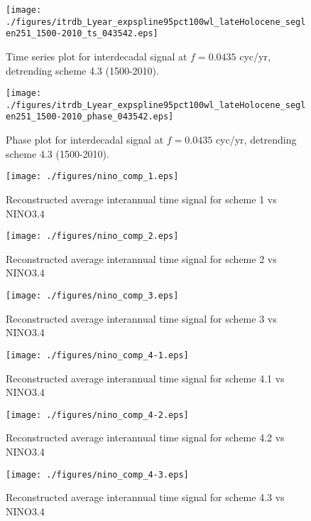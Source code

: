 \documentclass[phd,tocprelim]{cornell}
\begin{document}
\begin{figure}[!tbp]
\centering
\begin{minipage}[b]{0.45\textwidth}
\texttt{[image: ./figures/itrdb\_Lyear\_expspline95pct100wl\_lateHolocene\_seglen251\_1500-2010\_ts\_043542.eps]}
\caption{Time series plot for interdecadal signal at $f=0.0435$ cyc/yr, detrending scheme 4.3 (1500-2010).}
\label{ts4.3pl2}
\end{minipage}
\hfill
\begin{minipage}[b]{0.45\textwidth}
\texttt{[image: ./figures/itrdb\_Lyear\_expspline95pct100wl\_lateHolocene\_seglen251\_1500-2010\_phase\_043542.eps]}
\caption{Phase plot for interdecadal signal at $f=0.0435$ cyc/yr, detrending scheme 4.3 (1500-2010).}
\label{map4.3pl2}
\end{minipage}
\end{figure}

\clearpage
\newpage

\begin{figure}[!tbp]
\centering
\texttt{[image: ./figures/nino\_comp\_1.eps]}
\caption{Reconstructed average interannual time signal for scheme 1 vs NINO3.4}

\label{nino1}
\end{figure}

\begin{figure}[!tbp]
\centering
\texttt{[image: ./figures/nino\_comp\_2.eps]}
\caption{Reconstructed average interannual time signal for scheme 2 vs NINO3.4}

\label{nino2}
\end{figure}

\begin{figure}[!tbp]
\centering
\texttt{[image: ./figures/nino\_comp\_3.eps]}
\caption{Reconstructed average interannual time signal for scheme 3 vs NINO3.4}

\label{nino3}
\end{figure}

\begin{figure}[!tbp]
\centering
\texttt{[image: ./figures/nino\_comp\_4-1.eps]}
\caption{Reconstructed average interannual time signal for scheme 4.1 vs NINO3.4}

\label{nino4.1}
\end{figure}

\begin{figure}[!tbp]
\centering
\texttt{[image: ./figures/nino\_comp\_4-2.eps]}
\caption{Reconstructed average interannual time signal for scheme 4.2 vs NINO3.4}

\label{nino4.2}
\end{figure}

\begin{figure}[!tbp]
\centering
\texttt{[image: ./figures/nino\_comp\_4-3.eps]}
\caption{Reconstructed average interannual time signal for scheme 4.3 vs NINO3.4}

\label{nino4.3}
\end{figure}
\end{document}
